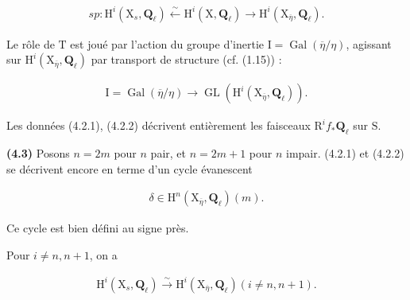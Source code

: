 \documentclass[10pt,leqno]{article}
\begin{document}
\begin{equation*}\begin{gathered}\mathit{sp} : \mathrm{H}^{i}(\mathrm{X}_{s},\mathbf{Q}_{\ell }) \xleftarrow{\sim } \mathrm{H}^{i}(\mathrm{X},\mathbf{Q}_{\ell }) \longrightarrow  \mathrm{H}^{i}(\mathrm{X}_{\overline{\eta }},\mathbf{Q}_{\ell }).\end{gathered}\tag{4.2.1}\end{equation*}

\noindent Le rôle de \(\mathrm{T}\) est joué par l’action du groupe d’inertie \(\mathrm{I}=\operatorname{Gal}(\overline{\eta }/\eta )\), agissant sur \(\mathrm{H}^{i}(\mathrm{X}_{\overline{\eta }},\mathbf{Q}_{\ell })\) par transport de structure (cf. (1.15)) :\par

\begin{equation*}\begin{gathered}\mathrm{I}=\operatorname{Gal}(\overline{\eta }/\eta ) \longrightarrow  \operatorname{GL}(\mathrm{H}^{i}(\mathrm{X}_{\overline{\eta }},\mathbf{Q}_{\ell })).\end{gathered}\tag{4.2.2}\end{equation*}

\noindent Les données (4.2.1), (4.2.2) décrivent entièrement les faisceaux \(\mathrm{R}^{i} f_{*}\mathbf{Q}_{\ell }\) sur \(\mathrm{S}\).\par

\noindent \textbf{(4.3)} Posons \(n=2m\) pour \(n\) pair, et \(n=2m+1\) pour \(n\) impair. (4.2.1) et (4.2.2) se décrivent encore en terme d’un cycle évanescent\par

\begin{equation*}\begin{gathered}\delta \in \mathrm{H}^{n}(\mathrm{X}_{\overline{\eta }},\mathbf{Q}_{\ell })(m).\end{gathered}\tag{4.3.1}\end{equation*}

\noindent Ce cycle est bien défini au signe près.\par

\noindent Pour \(i\ne n,n+1\), on a\par

\begin{equation*}\begin{gathered}\mathrm{H}^{i}(\mathrm{X}_{s},\mathbf{Q}_{\ell }) \xrightarrow{\sim } \mathrm{H}^{i}(\mathrm{X}_{\overline{\eta }},\mathbf{Q}_{\ell })    (i\ne n,n+1).\end{gathered}\tag{4.3.2}\end{equation*}
\end{document}

